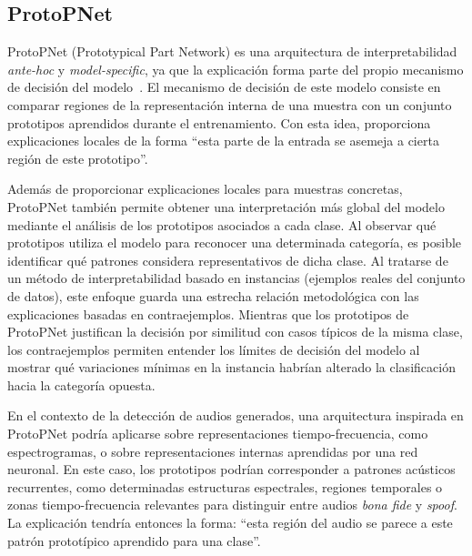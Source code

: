 \subsection{ProtoPNet}
\label{subsubsec:eda_ppnet}

ProtoPNet (Prototypical Part Network) es una arquitectura de interpretabilidad \textit{ante-hoc} y \textit{model-specific}, ya que la explicación forma parte del propio mecanismo de decisión del modelo~\parencite{2019protopnet}. El mecanismo de decisión de este modelo consiste en comparar regiones de la representación interna de una muestra con un conjunto prototipos aprendidos durante el entrenamiento. Con esta idea, proporciona explicaciones locales de la forma ``esta parte de la entrada se asemeja a cierta región de este prototipo''.

Además de proporcionar explicaciones locales para muestras concretas, ProtoPNet también permite obtener una interpretación más global del modelo mediante el análisis de los prototipos asociados a cada clase. Al observar qué prototipos utiliza el modelo para reconocer una determinada categoría, es posible identificar qué patrones considera representativos de dicha clase. Al tratarse de un método de interpretabilidad basado en instancias (ejemplos reales del conjunto de datos), este enfoque guarda una estrecha relación metodológica con las explicaciones basadas en contraejemplos. Mientras que los prototipos de ProtoPNet justifican la decisión por similitud con casos típicos de la misma clase, los contraejemplos permiten entender los límites de decisión del modelo al mostrar qué variaciones mínimas en la instancia habrían alterado la clasificación hacia la categoría opuesta.

En el contexto de la detección de audios generados, una arquitectura inspirada en ProtoPNet podría aplicarse sobre representaciones tiempo-frecuencia, como espectrogramas, o sobre representaciones internas aprendidas por una red neuronal. En este caso, los prototipos podrían corresponder a patrones acústicos recurrentes, como determinadas estructuras espectrales, regiones temporales o zonas tiempo-frecuencia relevantes para distinguir entre audios \textit{bona fide} y \textit{spoof}. La explicación tendría entonces la forma: ``esta región del audio se parece a este patrón prototípico aprendido para una clase''.
